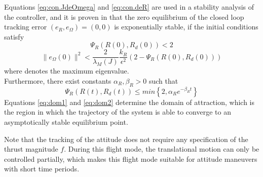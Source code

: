 Equations \ref{eq:con.JdeOmega} and \ref{eq:con.deR} are used in a stability analysis of the controller, and it is proven in \cite{Lee2010} 
that the zero equilibrium of the closed loop tracking error $ (e_R,e_\Omega)=(0,0) $ is exponentially stable, if the initial conditions satisfy
\begin{equation}\label{eq:dom1}
\Psi_R(R(0),R_d(0))<2
\end{equation}
\begin{equation}\label{eq:dom2}
\parallel e_\Omega(0)\parallel^2<\frac{2}{\lambda_M(J)}\frac{k_R}{\epsilon^2}(2-\Psi_R(R(0),R_d(0)))
\end{equation}
where  denotes the maximum eigenvalue. \\
Furthermore, there exist constants $ \alpha_R,\beta_R>0 $ such that
\begin{equation}\label{eq:con.proofPsiR}
\Psi_R(R(t),R_d(t)) \leq min\left\lbrace 2,\alpha_Re^{-\beta_Rt}\right\rbrace 
\end{equation}
Equations \ref{eq:dom1} and \ref{eq:dom2} determine the domain of attraction, which is the region in which the trajectory of the system is able to converge to an asymptotically stable equilibrium point. 

Note that the tracking of the  attitude does not require any specification of the thrust magnitude $ f $. During this flight mode, the translational motion can only be controlled partially, which makes this flight mode suitable for attitude maneuvers with short time periods.

